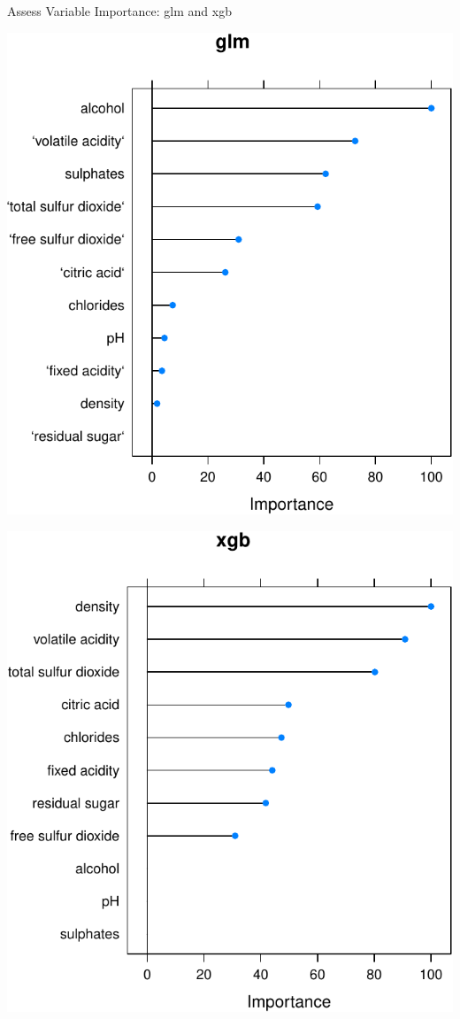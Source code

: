 \documentclass[ignorenonframetext,]{beamer}
\begin{document}
\begin{frame}{Assess Variable Importance: glm and xgb}

\includegraphics{ML_with_caret_files/figure-beamer/assess-var-glm-1.pdf}

\includegraphics{ML_with_caret_files/figure-beamer/assess-var-xgb-1.pdf}

\end{frame}
\end{document}
